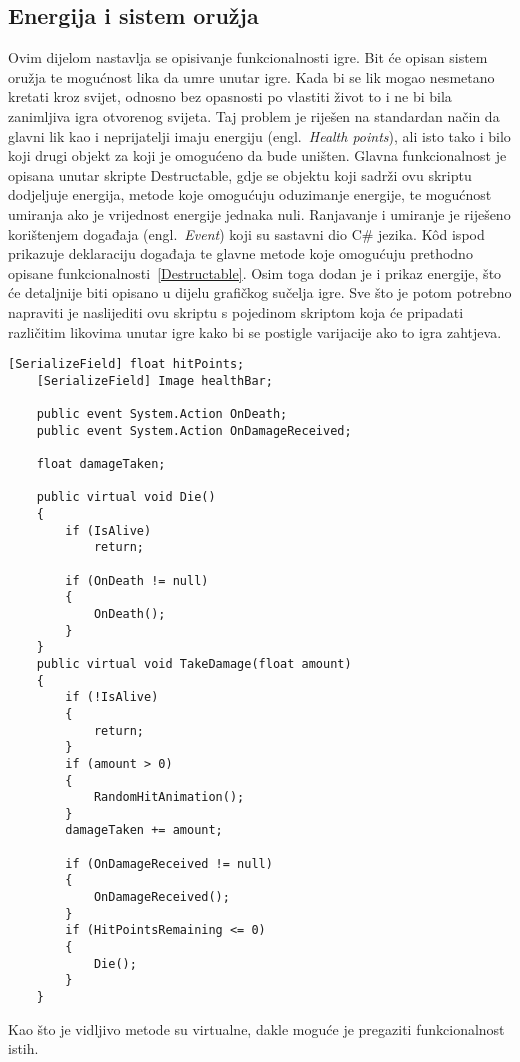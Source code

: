 \subsection{Energija i sistem oružja}
Ovim dijelom nastavlja se opisivanje funkcionalnosti igre. Bit će opisan sistem oružja te mogućnost lika da umre unutar igre.
Kada bi se lik mogao nesmetano kretati kroz svijet, odnosno bez opasnosti po vlastiti život to i ne bi bila zanimljiva igra otvorenog svijeta. Taj problem je riješen na standardan način da glavni lik kao i neprijatelji imaju energiju (engl.~\textit{Health points}), ali isto tako i bilo koji drugi objekt za koji je omogućeno da bude uništen. Glavna funkcionalnost je opisana unutar skripte Destructable, gdje se objektu koji sadrži ovu skriptu dodjeljuje energija, metode koje omogućuju oduzimanje energije, te mogućnost umiranja ako je vrijednost energije jednaka nuli. Ranjavanje i umiranje je riješeno korištenjem događaja (engl.~\textit{Event}) koji su sastavni dio C\# jezika. K\^od ispod prikazuje deklaraciju događaja te glavne metode koje omogućuju prethodno opisane funkcionalnosti~\ref{Destructable}. Osim toga dodan je i prikaz energije, što će detaljnije biti opisano u dijelu grafičkog sučelja igre. Sve što je potom potrebno napraviti je naslijediti ovu skriptu s pojedinom skriptom koja će pripadati različitim likovima unutar igre kako bi se postigle varijacije ako to igra zahtjeva.
\begin{lstlisting}[caption={Energija lika}, label=Destructable]
    [SerializeField] float hitPoints;
    [SerializeField] Image healthBar;

    public event System.Action OnDeath;
    public event System.Action OnDamageReceived;

    float damageTaken;

    public virtual void Die()
    {
        if (IsAlive)
            return;

        if (OnDeath != null)
        {
            OnDeath();
        }
    }
    public virtual void TakeDamage(float amount)
    {
        if (!IsAlive)
        {
            return;
        }
        if (amount > 0)
        {
            RandomHitAnimation();
        }
        damageTaken += amount;

        if (OnDamageReceived != null)
        {
            OnDamageReceived();
        }
        if (HitPointsRemaining <= 0)
        {
            Die();
        }
    }
\end{lstlisting}
Kao što je vidljivo metode su virtualne, dakle moguće je pregaziti funkcionalnost istih.

